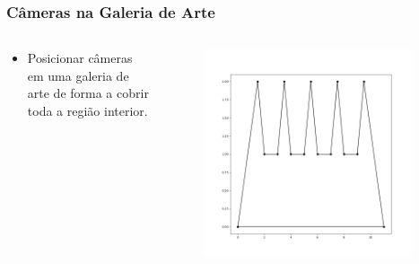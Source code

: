\documentclass[aspectratio=169,usenames,dvipsnames]{beamer}
\begin{document}
\begin{frame}
  \frametitle{Câmeras na Galeria de Arte}
  \begin{columns}
    \begin{center}
      \begin{itemize}
        \item Posicionar câmeras em uma galeria de arte de forma a cobrir toda a região interior.
      \end{itemize}
    \end{center}
    \begin{center}
      \begin{figure}
        \includegraphics[width=0.95\textwidth]{figures/conr_example.png}
      \end{figure}
    \end{center}
  \end{columns}
\end{frame}
\end{document}
